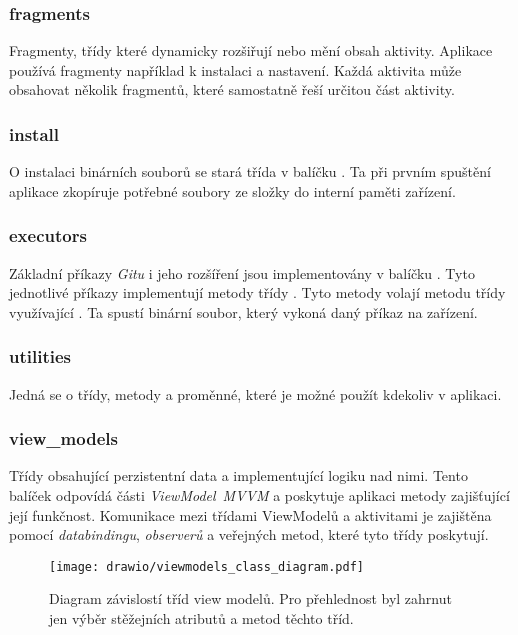     \subsubsection{fragments}
    Fragmenty, třídy které dynamicky rozšiřují nebo mění obsah aktivity. Aplikace používá fragmenty například k instalaci a nastavení. Každá aktivita může obsahovat několik fragmentů, které samostatně řeší určitou část aktivity.

    \subsubsection{install}
    O instalaci binárních souborů se stará třída  v balíčku . Ta při prvním spuštění aplikace zkopíruje potřebné soubory ze složky  do interní paměti zařízení.

    \subsubsection{executors}
    Základní příkazy \emph{Gitu} i jeho rozšíření jsou implementovány v balíčku . Tyto jednotlivé příkazy implementují metody třídy . Tyto metody volají metodu  třídy  využívající . Ta spustí binární soubor, který vykoná daný příkaz na zařízení.

    \subsubsection{utilities}
    Jedná se o třídy, metody a proměnné, které je možné použít kdekoliv v aplikaci.

    \newpage
    \subsubsection{view\_models}
    Třídy obsahující perzistentní data a implementující logiku nad nimi. Tento balíček odpovídá části \emph{ViewModel}~\emph{MVVM} a poskytuje aplikaci metody zajišťující její funkčnost. Komunikace mezi třídami ViewModelů a aktivitami je zajištěna pomocí \emph{databindingu}, \emph{observerů} a veřejných metod, které tyto třídy poskytují.

    \begin{figure}[h]
        \centering
        \vspace{0.5cm}
        \texttt{[image: drawio/viewmodels\_class\_diagram.pdf]}
        \caption[Diagram závislostí tříd view modelů]{Diagram závislostí tříd view modelů. Pro přehlednost byl zahrnut jen výběr stěžejních atributů a metod těchto tříd.}
        \label{diagram:view_models}
    \end{figure}

